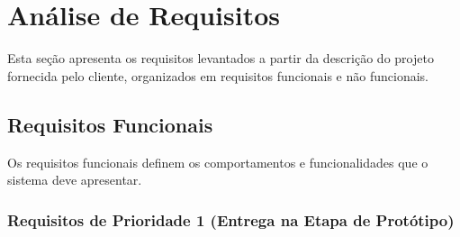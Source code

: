 
\section{Análise de Requisitos}

Esta seção apresenta os requisitos levantados a partir da descrição do projeto fornecida
pelo cliente, organizados em requisitos funcionais e não funcionais.

\subsection{Requisitos Funcionais}

Os requisitos funcionais definem os comportamentos e funcionalidades que o sistema
deve apresentar.

\subsubsection{Requisitos de Prioridade 1 (Entrega na Etapa de Protótipo)}

